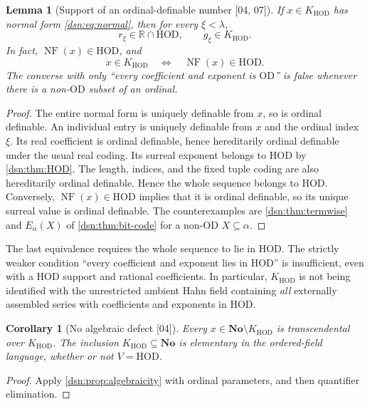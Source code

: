\documentclass[11pt,a4paper]{article}
\numberwithin{equation}{section}
\newtheorem{lemma}[lemma]{Lemma}
\newtheorem{corollary}[corollary]{Corollary}
\theoremstyle{definition}
\theoremstyle{remark}
\newcommand{\No}{\mathbf{No}}
\newcommand{\OD}{\mathrm{OD}}
\newcommand{\HOD}{\mathrm{HOD}}
\newcommand{\R}{\mathbb R}
\newcommand{\NF}{\operatorname{NF}}
\newcommand{\KH}{K_{\HOD}}
\newcommand{\src}[1]{\textup{\textsf{\small[#1]}}}
\begin{document}
\begin{lemma}[Support of an ordinal-definable number \src{04, 07}]
\label{dsn:lem:HODsupport}
If $x\in\KH$ has normal form \eqref{dsn:eq:normal}, then for every
$\xi<\lambda$,
\[
 r_\xi\in\R\cap\HOD,\qquad g_\xi\in\KH.
\]
In fact, $\NF(x)\in\HOD$, and
\begin{equation}\label{dsn:eq:NFcriterion}
 x\in\KH\quad\Longleftrightarrow\quad\NF(x)\in\HOD.
\end{equation}
The converse with only ``every coefficient and exponent is $\OD$'' is false
whenever there is a non-$\OD$ subset of an ordinal.
\end{lemma}
\begin{proof}
The entire normal form is uniquely definable from $x$, so is ordinal
definable. An individual entry is uniquely definable from $x$ and the
ordinal index $\xi$. Its real coefficient is ordinal definable, hence
hereditarily ordinal definable under the usual real coding. Its
surreal exponent belongs to $\HOD$ by \cref{dsn:thm:HOD}. The length,
indices, and the fixed tuple coding are also hereditarily ordinal
definable. Hence the whole sequence belongs to $\HOD$. Conversely,
$\NF(x)\in\HOD$ implies that it is ordinal definable, so its unique
surreal value is ordinal definable. The counterexamples are
\cref{dsn:thm:termwise} and $E_\alpha(X)$ of \cref{dsn:thm:bit-code} for a
non-$\OD$ $X\subseteq\alpha$.
\end{proof}

The last equivalence requires the whole sequence to lie in $\HOD$. The
strictly weaker condition ``every coefficient and exponent lies in
$\HOD$'' is insufficient, even with a $\HOD$ support and rational
coefficients. In particular, $\KH$ is not being identified with the
unrestricted ambient Hahn field containing \emph{all} externally assembled
series with coefficients and exponents in $\HOD$.

\begin{corollary}[No algebraic defect \src{04}]\label{dsn:cor:noalgebraic}
Every $x\in\No\setminus\KH$ is transcendental over $\KH$. The
inclusion $\KH\subseteq\No$ is elementary in the ordered-field
language, whether or not $V=\HOD$.
\end{corollary}
\begin{proof}
Apply \cref{dsn:prop:algebraicity} with ordinal parameters,
and then quantifier elimination.
\end{proof}
\end{document}
